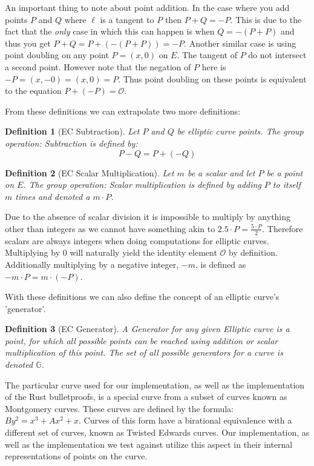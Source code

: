 \documentclass{article}
\newtheorem{definition}{Definition}[section]
\renewcommand{\O}{\mathcal{O}}
\newcommand{\G}{\mathbb{G}}
\begin{document}
An important thing to note about point addition. In the case where
you add points $P$ and $Q$ where $\ell$ is a tangent to $P$ then $P +
Q = -P$. This is due to the fact that the \textit{only} case in which
this can happen is when $Q = -(P + P)$ and thus you get $P + Q = P +
(-(P + P)) = -P$. Another similar case is using point doubling on any
point $P = (x,0)$ on $E$. The tangent of $P$ do not intersect
a second point. However note that the negation of $P$ here is $-P =
(x,-0) = (x,0) = P$. Thus point doubling on these points is equivalent
to the equation $P + (-P) = \O$.

From these definitions we can extrapolate two more definitions:

\begin{definition}[EC Subtraction]
	Let $P$ and $Q$ be elliptic curve points. The group operation:
	Subtraction is defined by:
	$$P-Q = P + (-Q)$$
\end{definition}

\begin{definition}[EC Scalar Multiplication]
	Let $m$ be a scalar and let $P$ be a point on $E$. The group operation:
	Scalar multiplication is defined by adding $P$ to itself $m$ times and
	denoted a $m\cdot P$.
\end{definition}

Due to the absence of scalar division it is impossible to multiply by
anything other than integers as we cannot have something akin to $2.5
\cdot P = \frac{5\cdot P}{2}$. Therefore scalars are always integers
when doing computations for elliptic curves. Multiplying by $0$ will
naturally yield the identity element $\mathcal{O}$ by definition.
Additionally multiplying by a negative integer, ${-m}$, is defined as
$-m\cdot P = m\cdot ({-P})$.

With these definitions we can also define the concept of an elliptic curve's 'generator'.

\begin{definition}[EC Generator]
	A Generator for any given Elliptic curve is a point, for which all possible points can be reached using addition or scalar multiplication of this point. The set of all possible generators for a curve is denoted $\G$.
\end{definition}

The particular curve used for our implementation, as well as the
implementation of the Rust bulletproofs, is a special curve from a subset
of curves known as Montgomery curves. These curves are defined by the
formula: $By^2 = x^3 + Ax^2 + x$. Curves of this form have a birational
equivalence with a different set of curves, known as Twisted Edwards
curves. Our implementation, as well as the implementation we test against
utilize this aspect in their internal representations of points on the
curve.
\end{document}
